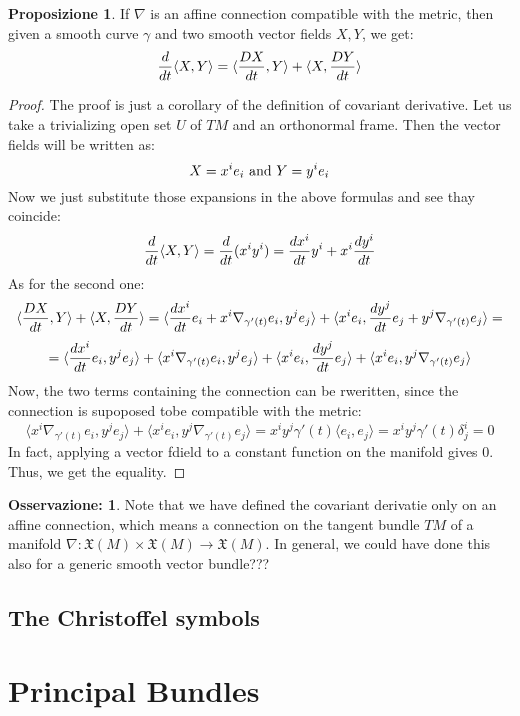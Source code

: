 \documentclass[12pt,a4paper]{report}
\theoremstyle{definition}
\theoremstyle{Theorem}
\newtheorem{Prop}[Def]{Proposizione}
\theoremstyle{definition}
\theoremstyle{definition}
\theoremstyle{definition}
\newtheorem{Obs}[Def]{Osservazione:}
\begin{document}
	\begin{Prop}
		If $\nabla$ is an affine connection compatible with the metric, then given a smooth curve $\gamma$ and two smooth vector fields $X,Y$, we get:
		$${d\over dt}\langle X,Y\rangle=\langle {DX\over dt},Y\rangle+\langle X,{DY\over dt}\rangle$$
	\end{Prop}
	\begin{proof}
		The proof is just a corollary of the definition of covariant derivative. Let us take a trivializing open set $U$ of $TM$ and an orthonormal frame. Then the vector fields will be written as:
		$$X=x^ie_i \hbox{ and } Y=y^ie_i$$
		Now we just substitute those expansions in the above formulas and see thay coincide:
		$${d\over dt}\langle X,Y\rangle={d\over dt}(x^iy^i)={dx^i\over dt}y^i+x^i{dy^i\over dt}$$
		As for the second one:
		$$\langle {DX\over dt},Y\rangle+\langle X,{DY\over dt}\rangle=
		\langle {dx^i\over dt}e_i+x^i\nabla_{\gamma'(t)}e_i,y^je_j\rangle+\langle x^ie_i,{dy^j\over dt}e_j+y^j\nabla_{\gamma'(t)}e_j\rangle=$$
		$$=\langle {dx^i\over dt}e_i,y^je_j\rangle+\langle x^i\nabla_{\gamma'(t)}e_i,y^je_j\rangle+\langle x^ie_i,{dy^j\over dt}e_j\rangle+\langle x^ie_i,y^j\nabla_{\gamma'(t)}e_j\rangle$$
		Now, the two terms containing the connection can be rweritten, since the connection is supoposed tobe compatible with the metric:
		$$\langle x^i\nabla_{\gamma'(t)}e_i,y^je_j\rangle+\langle x^ie_i,y^j\nabla_{\gamma'(t)}e_j\rangle=x^iy^j\gamma'(t)\langle e_i,e_j\rangle=x^iy^j\gamma'(t)\delta^i_j=0$$
		In fact, applying a vector fdield to a constant function on the manifold gives 0.
		Thus, we get the equality.
	\end{proof}
	\begin{Obs}
		Note that we have defined the covariant derivatie only on an affine connection, which means a connection on the tangent bundle $TM$ of a manifold $\nabla:\mathfrak{X}(M)\times\mathfrak{X}(M)\rightarrow\mathfrak{X}(M)$. In general, we could have done this also for a generic smooth vector bundle???
	\end{Obs}
	\section{The Christoffel symbols}
	\chapter{Principal Bundles}
\end{document}
